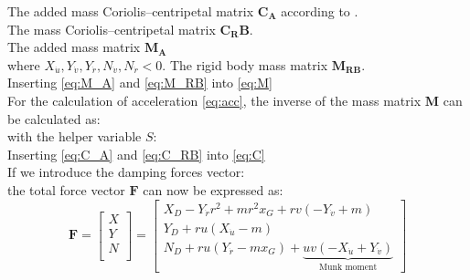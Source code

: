 The added mass Coriolis–centripetal matrix $\mathbf{C_A}$ according to \citep{imlayCOMPLETEEXPRESSIONSADDED1961}.
\begin{equation}
    \label{eq:C_A}
    
\end{equation}
The mass Coriolis–centripetal matrix $\mathbf{C_RB}$.
\begin{equation}
    \label{eq:C_RB}
    
\end{equation}
The added mass matrix $\mathbf{M_A}$
\begin{equation}
    \label{eq:M_A}
    
\end{equation}
where $X_{\dot{u}},Y_{\dot{v}},Y_{\dot{r}},N_{\dot{v}},N_{\dot{r}} < 0$. 
The rigid body mass matrix $\mathbf{M_{RB}}$.
\begin{equation}
    \label{eq:M_RB}
    
\end{equation}
Inserting \autoref{eq:M_A} and \autoref{eq:M_RB} into \autoref{eq:M}
\begin{equation}
    \label{eq:M_expanded}
    
\end{equation}
For the calculation of acceleration \autoref{eq:acc}, the inverse of the mass matrix $\mathbf{M}$ can be calculated as:
\begin{equation}
    \label{eq:M_inv}
    
\end{equation}
with the helper variable $S$:
\begin{equation}
    \label{eq:S}
    
\end{equation}
Inserting \autoref{eq:C_A} and \autoref{eq:C_RB} into \autoref{eq:C}
\begin{equation}
    \label{eq:C_expanded}
    
\end{equation}
If we introduce the damping forces vector:
\begin{equation}
    \label{eq:D}
    
\end{equation}
the total force vector $\bm{F}$ can now be expressed as:
\begin{equation}
    \label{eq:F_expanded}
\mathbf{F} = 
\left[\begin{matrix}
X \\
Y \\
N \\
\end{matrix}\right]
=
\left[\begin{matrix}X_{D} - Y_{\dot{r}} r^{2} + m r^{2} x_{G} + r v \left(- Y_{\dot{v}} + m\right)\\Y_{D} + r u \left(X_{\dot{u}} - m\right)\\N_{D} + r u \left(Y_{\dot{r}} - m x_{G}\right) + \underbrace{u v \left(- X_{\dot{u}} + Y_{\dot{v}}\right)}_{\text{Munk moment}} \end{matrix}\right]
\end{equation}
